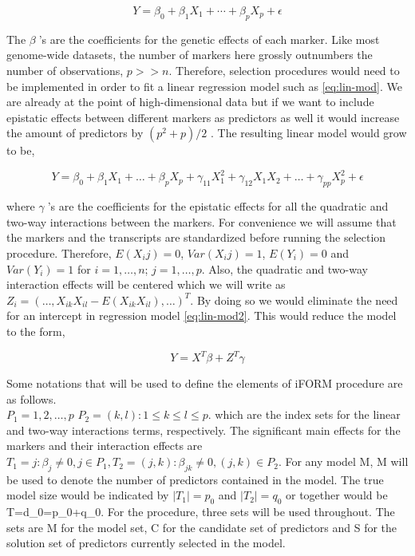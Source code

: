 \documentclass[11pt,]{book}
\theoremstyle{definition}
\theoremstyle{definition}
\theoremstyle{remark}
\begin{document}
\begin{equation}
Y = \beta_0 + \beta_1 X_1 + ⋯ + \beta_p X_p + \epsilon
\label{eq:lin-mod}
\end{equation}

The \(\beta\)'s are the coefficients for the genetic effects of each
marker. Like most genome-wide datasets, the number of markers here
grossly outnumbers the number of observations, \(p >> n\). Therefore,
selection procedures would need to be implemented in order to fit a
linear regression model such as \eqref{eq:lin-mod}. We are already at the
point of high-dimensional data but if we want to include epistatic
effects between different markers as predictors as well it would
increase the amount of predictors by \((p^2+p)/2\) . The resulting
linear model would grow to be,

\begin{equation}
Y = \beta_0 + \beta_1 X_1 + \dots + \beta_p X_p + \gamma_{11} X_1^2 +\gamma_{12} {X_1}{X_2} + \dots + \gamma_{pp} X_p^2 + \epsilon
\label{eq:lin-mod2}
\end{equation}

where \(\gamma\)'s are the coefficients for the epistatic effects for
all the quadratic and two-way interactions between the markers. For
convenience we will assume that the markers and the transcripts are
standardized before running the selection procedure. Therefore,
\(E(X_ij )=0\), \(Var(X_ij )=1\), \(E(Y_i )=0\) and \(Var(Y_i )=1\) for
\(i=1,\dots,n\); \(j=1,\dots,p\). Also, the quadratic and two-way
interaction effects will be centered which we will write as
\(Z_i=(\dots,X_{ik} X_{il}-E(X_{ik} X_{il} ),\dots)^T\). By doing so we
would eliminate the need for an intercept in regression model
\eqref{eq:lin-mod2}. This would reduce the model to the form,

\begin{equation}
Y = X^T \beta + Z^T \gamma
\label{eq:lin-mod3}
\end{equation}

Some notations that will be used to define the elements of
\cite{hao2014interaction} iFORM procedure are as follows.\\
\(P_1 = {1,2,\dots,p}\) \(P_2 = {(k,l):1 \le k \le l \le p}\). which are
the index sets for the linear and two-way interactions terms,
respectively. The significant main effects for the markers and their
interaction effects are
\(T_1 = {j:\beta_j \ne 0,j\in P_1},T_2 = {(j,k):\beta_{jk} \ne 0,(j,k) \in P_2}\).
For any model M, \textbar{}M\textbar{} will be used to denote the number
of predictors contained in the model. The true model size would be
indicated by \(|T_1| = p_0\) and \(|T_2| = q_0\) or together would be
\textbar{}T\textbar{}=d\_0=p\_0+q\_0. For the procedure, three sets will
be used throughout. The sets are M for the model set, C for the
candidate set of predictors and S for the solution set of predictors
currently selected in the model.
\end{document}
